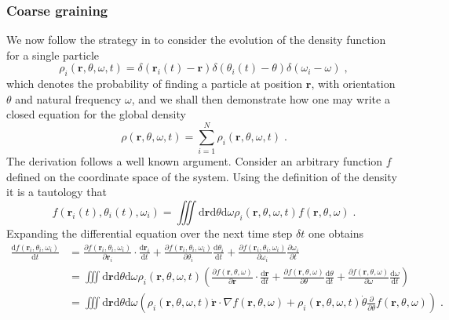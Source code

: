 \documentclass{article}
\begin{document}
\subsubsection{Coarse graining}
We now follow the strategy in \cite{DavidSDean_1996} to consider the evolution of the density function for a single particle
\begin{equation}
    \rho _i\left( \mathbf{r},\theta ,\omega ,t \right) =\delta \left( \mathbf{r}_i\left( t \right) -\mathbf{r} \right) \delta \left( \theta _i\left( t \right) -\theta \right) \delta \left( \omega _i-\omega \right)\;, 
\end{equation}
which denotes the probability of finding a particle at position $\mathbf{r}$, with orientation $\theta$ and natural frequency $\omega$, and we shall then demonstrate how one may write a closed equation for the global density
\begin{equation}
    \rho \left( \mathbf{r},\theta ,\omega ,t \right) =\sum_{i=1}^N{\rho _i\left( \mathbf{r},\theta ,\omega ,t \right)}\;.
\end{equation}
The derivation follows a well known argument. Consider an arbitrary function $f$ defined on the coordinate space of the system. Using the definition of the density it is a tautology
that
\begin{equation}
    \label{eq:arbitraryFunction}
    f\left( \mathbf{r}_i\left( t \right) ,\theta _i\left( t \right) ,\omega _i \right) =\iiint{\text{d}\mathbf{r}\text{d}\theta \text{d}\omega \rho _i\left( \mathbf{r},\theta ,\omega ,t \right) f\left( \mathbf{r},\theta ,\omega \right)}\;.
\end{equation}
Expanding the differential equation over the next time step $\delta t$ one obtains
\begin{equation}
    \begin{aligned}
        \frac{\text{d}f\left( \mathbf{r}_i,\theta _i,\omega _i \right)}{\text{d}t}&=\frac{\partial f\left( \mathbf{r}_i,\theta _i,\omega _i \right)}{\partial \mathbf{r}_i}\cdot \frac{\text{d}\mathbf{r}_i}{\text{d}t}+\frac{\partial f\left( \mathbf{r}_i,\theta _i,\omega _i \right)}{\partial \theta _i}\frac{\text{d}\theta _i}{\text{d}t}+\frac{\partial f\left( \mathbf{r}_i,\theta _i,\omega _i \right)}{\partial \omega _i}\frac{\partial \omega _i}{\partial t}\\
        &=\iiint{\text{d}\mathbf{r}\text{d}\theta \text{d}\omega \rho _i\left( \mathbf{r},\theta ,\omega ,t \right) \left( \frac{\partial f\left( \mathbf{r},\theta ,\omega \right)}{\partial \mathbf{r}}\cdot \frac{\text{d}\mathbf{r}}{\text{d}t}+\frac{\partial f\left( \mathbf{r},\theta ,\omega \right)}{\partial \theta}\frac{\text{d}\theta}{\text{d}t}+\frac{\partial f\left( \mathbf{r},\theta ,\omega \right)}{\partial \omega}\frac{\text{d}\omega}{\text{d}t} \right)}\\
        &=\iiint{\text{d}\mathbf{r}\text{d}\theta \text{d}\omega \left( \rho _i\left( \mathbf{r},\theta ,\omega ,t \right) \mathbf{\dot{r}}\cdot \nabla f\left( \mathbf{r},\theta ,\omega \right) +\rho _i\left( \mathbf{r},\theta ,\omega ,t \right) \dot{\theta}\frac{\partial}{\partial \theta}f\left( \mathbf{r},\theta ,\omega \right) \right)}\;.\\
    \end{aligned}
\end{equation}
\end{document}
